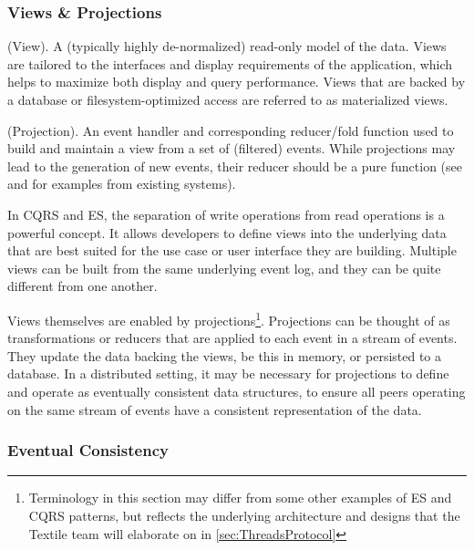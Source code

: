 \documentclass{textile}
\begin{document}
\subsubsection{Views \& Projections} \label{sec:ViewsProjections}

\begin{definition}  (View). A (typically highly de-normalized) read-only model of the data. Views are tailored to the interfaces and display requirements of the application, which helps to maximize both display and query performance. Views that are backed by a database or filesystem-optimized access are referred to as materialized views. \end{definition}

\begin{definition} (Projection). An event handler and corresponding reducer/fold function used to build and maintain a view from a set of (filtered) events. While projections may lead to the generation of new events, their reducer should be a pure function (see \cite{eventsouceEventSourcingBasics} and \cite{redux.js.orgGettingStartedRedux} for examples from existing systems). \end{definition}

In CQRS and ES, the separation of write operations from read operations is a powerful concept. It allows developers to define views into the underlying data that are best suited for the use case or user interface they are building. Multiple views can be built from the same underlying event log, and they can be quite different from one another.

Views themselves are enabled by projections\footnote{Terminology in this section may differ from some other examples of ES and CQRS patterns, but reflects the underlying architecture and designs that the Textile team will elaborate on in \ref{sec:ThreadsProtocol}}. Projections can be thought of as transformations or reducers that are applied to each event in a stream of events. They update the data backing the views, be this in memory, or persisted to a database. In a distributed setting, it may be necessary for projections to define and operate as eventually consistent data structures, to ensure all peers operating on the same stream of events have a consistent representation of the data.

\subsubsection{Eventual Consistency} \label{sec:EventualConsistency}
\end{document}
